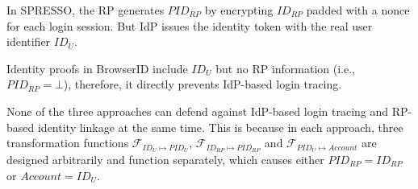 In SPRESSO, the RP generates $PID_{RP}$ by encrypting $ID_{RP}$ padded with a nonce %
for each login session.  But IdP issues the identity token with the real user identifier $ID_U$.

Identity proofs in BrowserID include $ID_U$ but no RP information (i.e., $PID_{RP} = \bot$), therefore, it directly prevents IdP-based login tracing. 

None of the three approaches can defend against IdP-based login tracing and RP-based identity linkage at the same time. This is because in each approach, three transformation functions $\mathcal{F}_{ID_{U} \mapsto PID_U}$, $\mathcal{F}_{ID_{RP} \mapsto PID_{RP}}$ and $\mathcal{F}_{PID_{U} \mapsto Account}$ are designed arbitrarily and function separately, which causes either $PID_{RP} = ID_{RP}$ or $Account = ID_U$.

